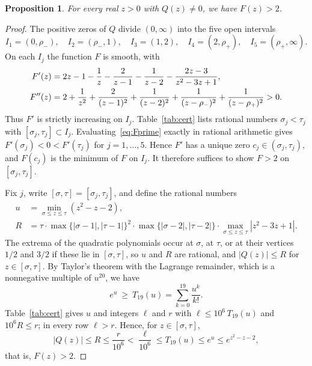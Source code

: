\documentclass{amsart}
\newtheorem{proposition}[theorem]{Proposition}
\theoremstyle{definition}
\theoremstyle{remark}
\numberwithin{equation}{section}
\newcommand{\rhom}{\rho_-}
\newcommand{\rhop}{\rho_+}
\begin{document}
\begin{proposition}\label{prop:aux}
For every real $z>0$ with $Q(z)\neq0$, we have $F(z)>2$.
\end{proposition}

\begin{proof}
The positive zeros of $Q$ divide $(0,\infty)$ into the five open intervals
\[
I_1=(0,\rhom),\quad I_2=(\rhom,1),\quad I_3=(1,2),\quad I_4=(2,\rhop),\quad I_5=(\rhop,\infty).
\]
On each $I_j$ the function $F$ is smooth, with
\begin{align}
F'(z)&=2z-1-\frac1z-\frac{2}{z-1}-\frac{1}{z-2}-\frac{2z-3}{z^2-3z+1},\label{eq:Fprime}\\
F''(z)&=2+\frac1{z^2}+\frac2{(z-1)^2}+\frac1{(z-2)^2}+\frac1{(z-\rhom)^2}+\frac1{(z-\rhop)^2}>0.\notag
\end{align}
Thus $F'$ is strictly increasing on $I_j$. Table~\ref{tab:cert} lists rational numbers $\sigma_j<\tau_j$ with $[\sigma_j,\tau_j]\subset I_j$. Evaluating~\eqref{eq:Fprime} exactly in rational arithmetic gives $F'(\sigma_j)<0<F'(\tau_j)$ for $j=1,\dots,5$. Hence $F'$ has a unique zero $c_j\in(\sigma_j,\tau_j)$, and $F(c_j)$ is the minimum of $F$ on $I_j$. It therefore suffices to show $F>2$ on $[\sigma_j,\tau_j]$.

Fix $j$, write $[\sigma,\tau]=[\sigma_j,\tau_j]$, and define the rational numbers
\begin{align*}
u&=\min_{\sigma\le z\le \tau}(z^2-z-2),\\
R&=\tau\cdot\max\{|\sigma-1|,|\tau-1|\}^2\cdot\max\{|\sigma-2|,|\tau-2|\}\cdot\max_{\sigma\le z\le \tau}|z^2-3z+1|.
\end{align*}
The extrema of the quadratic polynomials occur at $\sigma$, at $\tau$, or at their vertices $1/2$ and $3/2$ if these lie in $[\sigma,\tau]$, so $u$ and $R$ are rational, and $|Q(z)|\le R$ for $z\in[\sigma,\tau]$. By Taylor's theorem with the Lagrange remainder, which is a nonnegative multiple of $u^{20}$, we have
\[
e^u\ \ge\ T_{19}(u)=\sum_{k=0}^{19}\frac{u^k}{k!}.
\]
Table~\ref{tab:cert} gives $u$ and integers $\ell$ and $r$ with $\ell\le10^6\,T_{19}(u)$ and $10^6R\le r$; in every row $\ell>r$. Hence, for $z\in[\sigma,\tau]$,
\[
|Q(z)|\le R\le\frac{r}{10^6}<\frac{\ell}{10^6}\le T_{19}(u)\le e^u\le e^{z^2-z-2},
\]
that is, $F(z)>2$.
\end{proof}
\end{document}
